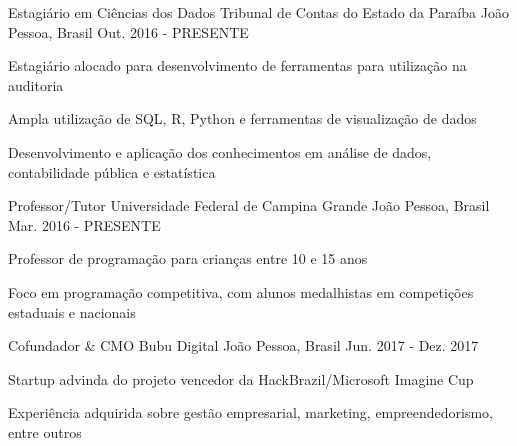 

\begin{cventries}
  \cventry
    {Estagiário em Ciências dos Dados} %
    {Tribunal de Contas do Estado da Paraíba} %
    {João Pessoa, Brasil} %
    {Out. 2016 - PRESENTE} %
    {
      \begin{cvitems} %
        \item {Estagiário alocado para desenvolvimento de ferramentas para utilização na auditoria}
        \item {Ampla utilização de SQL, R, Python e ferramentas de visualização de dados}
        \item {Desenvolvimento e aplicação dos conhecimentos em análise de dados, contabilidade pública e estatística}
      \end{cvitems}
    }

  \cventry
    {Professor/Tutor} %
    {Universidade Federal de Campina Grande} %
    {João Pessoa, Brasil} %
    {Mar. 2016 - PRESENTE} %
    {
      \begin{cvitems} %
        \item {Professor de programação para crianças entre 10 e 15 anos}
        \item {Foco em programação competitiva, com alunos medalhistas em competições estaduais e nacionais}
      \end{cvitems}
    }

      \cventry
        {Cofundador \& CMO} %
        {Bubu Digital} %
        {João Pessoa, Brasil} %
        {Jun. 2017 - Dez. 2017} %
        {
          \begin{cvitems} %
            \item {Startup advinda do projeto vencedor da HackBrazil/Microsoft Imagine Cup}
            \item {Experiência adquirida sobre gestão empresarial, marketing, empreendedorismo, entre outros}
          \end{cvitems}
        }


\end{cventries}
